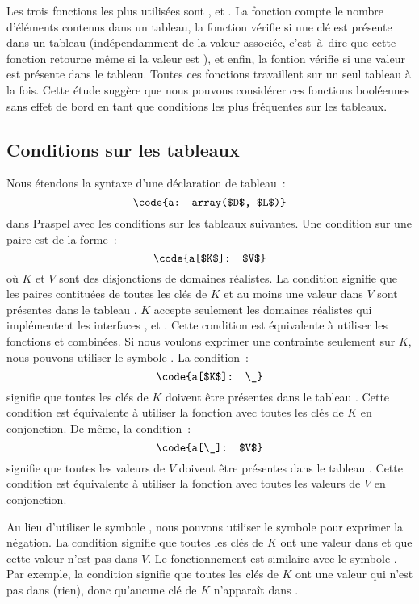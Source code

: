 %
Les trois fonctions les plus utilisées sont ,
 et . La fonction 
compte le nombre d'éléments contenus dans un tableau, la fonction
 vérifie si une clé est présente dans un tableau
(indépendamment de la valeur associée, c'est~à~dire que cette fonction retourne
 même si la valeur est ), et enfin, la fontion
 vérifie si une valeur est présente dans le tableau. Toutes
ces fonctions travaillent sur un seul tableau à la fois. Cette étude suggère que
nous pouvons considérer ces fonctions booléennes sans effet de bord en tant que
conditions les plus fréquentes sur les tableaux.

\subsection{Conditions sur les tableaux}

Nous étendons la syntaxe d'une déclaration de tableau~:
%
$$\code{a: array($D$, $L$)}$$
%
dans Praspel avec les conditions sur les tableaux suivantes. Une condition sur
une paire est de la forme~:
%
$$\code{a[$K$]: $V$}$$
%
où $K$ et $V$ sont des disjonctions de domaines réalistes. La condition signifie
que les paires contituées de toutes les clés de $K$ et au moins une valeur dans
$V$ sont présentes dans le tableau . $K$ accepte seulement les domaines
réalistes qui implémentent les interfaces ,  et
. Cette condition est équivalente à utiliser les fonctions
 et  combinées. Si nous voulons
exprimer une contrainte seulement sur $K$, nous pouvons utiliser le symbole
\code{\_}. La condition~:
%
$$\code{a[$K$]: \_}$$
%
signifie que toutes les clés de $K$ doivent être présentes dans le tableau
. Cette condition est équivalente à utiliser la fonction
 avec toutes les clés de $K$ en conjonction. De même,
la condition~:
%
$$\code{a[\_]: $V$}$$
%
signifie que toutes les valeurs de $V$ doivent être présentes dans le tableau
. Cette condition est équivalente à utiliser la fonction
 avec toutes les valeurs de $V$ en conjonction.

Au lieu d'utiliser le symbole \code{:}, nous pouvons utiliser le symbole
\code{!:} pour exprimer la négation. La condition  signifie
que toutes les clés de $K$ ont une valeur dans  et que cette valeur
n'est pas dans $V$. Le fonctionnement est similaire avec le symbole \code{\_}.
Par exemple, la condition  signifie que toutes les clés de $K$
ont une valeur qui n'est pas dans \code{\_} (rien), donc qu'aucune clé de $K$
n'apparaît dans .


